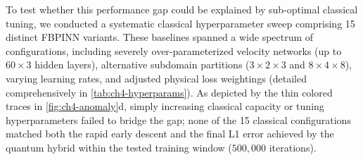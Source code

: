 To test whether this performance gap could be explained by sub-optimal classical tuning, we conducted a systematic classical hyperparameter sweep comprising 15 distinct FBPINN variants. These baselines spanned a wide spectrum of configurations, including severely over-parameterized velocity networks (up to $60\!\times\!3$ hidden layers), alternative subdomain partitions ($3\!\times\!2\!\times\!3$ and $8\!\times\!4\!\times\!8$), varying learning rates, and adjusted physical loss weightings (detailed comprehensively in \ref{tab:ch4-hyperparams}). As depicted by the thin colored traces in \ref{fig:ch4-anomaly}d, simply increasing classical capacity or tuning hyperparameters failed to bridge the gap; none of the 15 classical configurations matched both the rapid early descent and the final L1 error achieved by the quantum hybrid within the tested training window ($500{,}000$ iterations).

